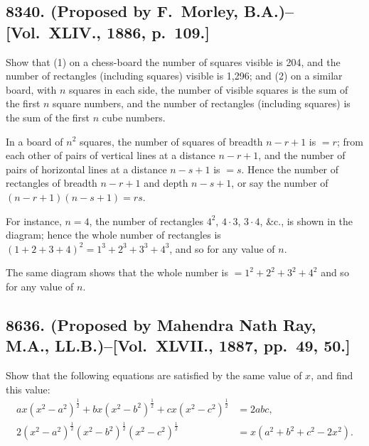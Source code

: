 \documentclass[11pt,a4paper]{book}
\begin{document}
\subsection*{8340. (Proposed by F.~Morley, B.A.)\---[Vol.~XLIV., 1886, p.~109.]}

Show that (1) on a chess-board the number of squares visible is 204, and the number of rectangles (including squares) visible is 1,296; and (2) on a similar board, with $n$ squares in each side, the number of visible squares is the sum of the first $n$ square numbers, and the number of rectangles (including squares) is the sum of the first $n$ cube numbers.

\begin{solution}
In a board of $n^2$ squares, the number of squares of breadth $n-r+1$ is $=r$; from each other of pairs of vertical lines at a distance $n-r+1$, and the number of pairs of horizontal lines at a distance $n-s+1$ is $=s$. Hence the number of rectangles of breadth $n-r+1$ and depth $n-s+1$, or say the number of $(n-r+1)(n-s+1)=rs$.

For instance, $n=4$, the number of rectangles $4^2$, $4\cdot3$, $3\cdot4$, \&c., is shown in the diagram; hence the whole number of rectangles is $(1+2+3+4)^2 = 1^3+2^3+3^3+4^3$, and so for any value of $n$.

The same diagram shows that the whole number is $=1^2+2^2+3^2+4^2$ and so for any value of $n$.
\end{solution}

\subsection*{8636. (Proposed by Mahendra Nath Ray, M.A., LL.B.)\---[Vol.~XLVII., 1887, pp.~49, 50.]}

Show that the following equations are satisfied by the same value of $x$, and find this value:
\[
\begin{aligned}
ax(x^2-a^2)^{\frac{1}{2}} + bx(x^2-b^2)^{\frac{1}{2}} + cx(x^2-c^2)^{\frac{1}{2}} &= 2abc, \\
2(x^2-a^2)^{\frac{1}{2}}(x^2-b^2)^{\frac{1}{2}}(x^2-c^2)^{\frac{1}{2}} &= x(a^2+b^2+c^2-2x^2).
\end{aligned}
\]
\end{document}
